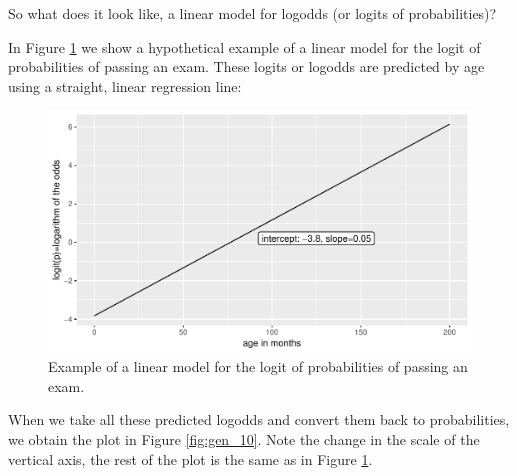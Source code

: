 \documentclass[]{book}\usepackage[]{graphicx}\usepackage[]{color}
\makeatletter
\def\maxwidth{ %
  \ifdim\Gin@nat@width>\linewidth
    \linewidth
  \else
    \Gin@nat@width
  \fi
}
\newenvironment{knitrout}{}{} %
\makeatother
\begin{document}
So what does it look like, a linear model for logodds (or logits of probabilities)?

In Figure \ref{fig:gen_9} we show a hypothetical example of a linear model for the logit of probabilities of passing an exam. These logits or logodds are predicted by age using a straight, linear regression line:


\begin{knitrout}
\color{fgcolor}\begin{figure}

{\centering \includegraphics[width=\maxwidth]{figure/gen_9-1} 

}

\caption[Example of a linear model for the logit of probabilities of passing an exam]{Example of a linear model for the logit of probabilities of passing an exam.}\label{fig:gen_9}
\end{figure}


\end{knitrout}
% 
When we take all these predicted logodds and convert them back to probabilities, we obtain the plot in Figure \ref{fig:gen_10}. Note the change in the scale of the vertical axis, the rest of the plot is the same as in Figure \ref{fig:gen_9}.
\end{document}
